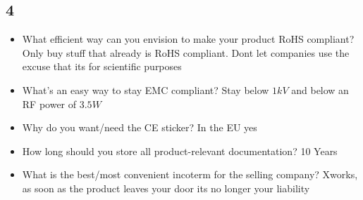 \documentclass{alex_summary}
\begin{document}
	\subsection*{4}
	\begin{itemize}
		\item What efficient way can you envision to make your product RoHS compliant?
		Only buy stuff that already is RoHS compliant. Dont let companies use the excuse that its for scientific purposes
		\item What’s an easy way to stay EMC compliant?
		Stay below \( 1 \unit{kV} \) and below an RF power of \( 3.5 \unit{W} \)
		\item Why do you want/need the CE sticker?
		In the EU yes
		\item How long should you store all product-relevant documentation?
		10 Years
		\item What is the best/most convenient incoterm for the selling company?
		Xworks, as soon as the product leaves your door its no longer your liability
	\end{itemize}
\end{document}
